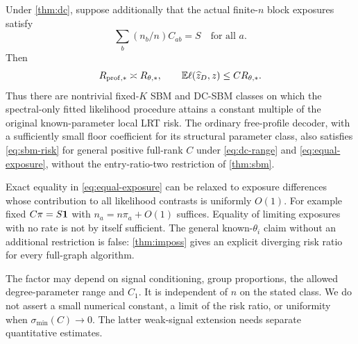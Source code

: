 \begin{corollary}
\label{cor:known}
Under \cref{thm:dc}, suppose additionally that the actual finite-$n$ block
exposures satisfy
\begin{equation}\label{eq:equal-exposure}
 \sum_b(n_b/n)C_{ab}=S\quad\text{for all }a.
\end{equation}
Then
\[
 R_{\mathrm{prof},*}\asymp R_{\theta,*},\qquad
 \mathbb E\ell(\widehat z_D,z)\le C R_{\theta,*}.
\]
Thus there are nontrivial fixed-$K$ SBM and DC-SBM classes on which the
spectral-only fitted likelihood procedure attains a constant multiple of
the original known-parameter local LRT risk. The ordinary free-profile
decoder, with a sufficiently small floor coefficient for its structural
parameter class, also satisfies \eqref{eq:sbm-risk} for general positive
full-rank $C$ under \eqref{eq:dc-range} and \eqref{eq:equal-exposure},
without the entry-ratio-two restriction of \cref{thm:sbm}.
\end{corollary}

Exact equality in \eqref{eq:equal-exposure} can be relaxed to exposure
differences whose contribution to all likelihood contrasts is uniformly
$O(1)$. For example fixed $C\pi=S\mathbf 1$ with
$n_a=n\pi_a+O(1)$ suffices. Equality of limiting exposures with no rate
is not by itself sufficient. The general known-$\theta_i$ claim without
an additional restriction is false: \cref{thm:imposs} gives an explicit
diverging risk ratio for every full-graph algorithm.

\begin{remark}
The factor may depend on signal conditioning, group proportions, the
allowed degree-parameter range and $C_1$. It is independent of $n$ on
the stated class. We do not assert a small numerical constant, a limit of
the risk ratio, or uniformity when $\sigma_{\min}(C)\to0$. The latter
weak-signal extension needs separate quantitative estimates.
\end{remark}

